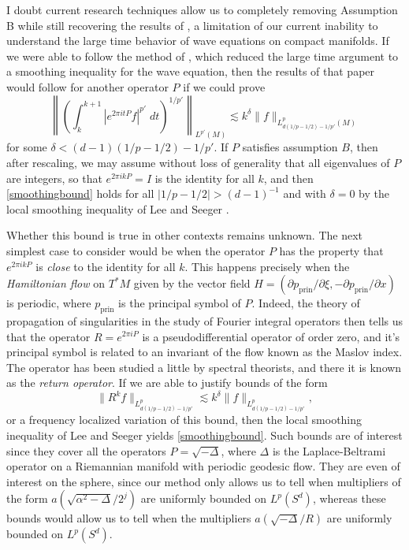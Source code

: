 \documentclass[11pt]{article}
\begin{document}
I doubt current research techniques allow us to completely removing Assumption B while still recovering the results of \cite{DensonCharacterization}, a limitation of our current inability to understand the large time behavior of wave equations on compact manifolds. If we were able to follow the method of \cite{DensonThesis}, which reduced the large time argument to a smoothing inequality for the wave equation, then the results of that paper would follow for another operator $P$ if we could prove
%
\begin{equation} \label{smoothingbound}
	\left\| \left( \int_k^{k+1} |e^{2 \pi i t P} f|^{p'}\; dt \right)^{1/p'} \right\|_{L^{p'}(M)} \lesssim k^\delta \| f \|_{L^p_{d(1/p - 1/2) - 1/p'}(M)}
\end{equation}
%
for some $\delta < (d-1)(1/p - 1/2) - 1/p'$. If $P$ satisfies assumption $B$, then after rescaling, we may assume without loss of generality that all eigenvalues of $P$ are integers, so that $e^{2 \pi i k P} = I$ is the identity for all $k$, and then \eqref{smoothingbound} holds for all $|1/p - 1/2| > (d-1)^{-1}$ and with $\delta = 0$ by the local smoothing inequality of Lee and Seeger \cite{LeeSeeger}. 

Whether this bound is true in other contexts remains unknown. The next simplest case to consider would be when the operator $P$ has the property that $e^{2 \pi i k P}$ is \emph{close} to the identity for all $k$. This happens precisely when the \emph{Hamiltonian flow} on $T^* M$ given by the vector field $H = ( \partial p_{\text{prin}} / \partial \xi , - \partial p_{\text{prin}} / \partial x)$ is periodic, where $p_{\text{prin}}$ is the principal symbol of $P$. Indeed, the theory of propagation of singularities in the study of Fourier integral operators then tells us that the operator $R = e^{2 \pi i P}$ is a pseudodifferential operator of order zero, and it's principal symbol is related to an invariant of the flow known as the Maslov index. The operator has been studied a little by spectral theorists, and there it is known as the \emph{return operator}. If we are able to justify bounds of the form
%
\[ \| R^k f \|_{L^p_{d(1/p - 1/2) - 1/p'}} \lesssim k^\delta \| f \|_{L^p_{d(1/p - 1/2) - 1/p'}}, \]
%
or a frequency localized variation of this bound, then the local smoothing inequality of Lee and Seeger yields \eqref{smoothingbound}. Such bounds are of interest since they cover all the operators $P = \sqrt{-\Delta}$, where $\Delta$ is the Laplace-Beltrami operator on a Riemannian manifold with periodic geodesic flow. They are even of interest on the sphere, since our method only allows us to tell when multipliers of the form $a( \sqrt{\alpha^2 - \Delta} / 2^j )$ are uniformly bounded on $L^p(S^d)$, whereas these bounds would allow us to tell when the multipliers $a( \sqrt{-\Delta} / R )$ are uniformly bounded on $L^p(S^d)$.
\end{document}
